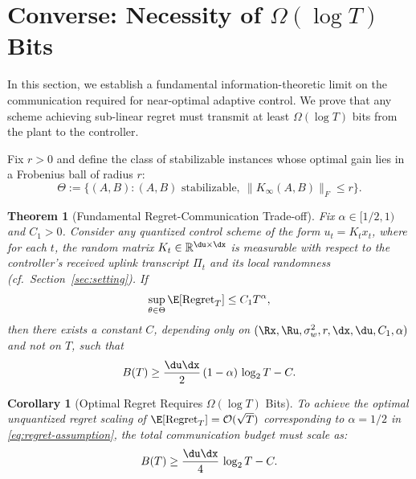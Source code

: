 \documentclass[11pt,journal,onecolumn]{IEEEtran}
\newtheorem{theorem}{Theorem}
\newtheorem{corollary}{Corollary}
\newcommand{\R}{\mathbb{R}}
\begin{document}
\section{Converse: Necessity of \texorpdfstring{$\Omega(\log T)$}{Omega(log T)} Bits}
\label{sec:converse}

In this section, we establish a fundamental information-theoretic limit on the communication required for near-optimal adaptive control. We prove that any scheme achieving sub-linear regret must transmit at least $\Omega(\log T)$ bits from the plant to the controller.

Fix $r>0$ and define the class of stabilizable instances whose optimal gain lies in a Frobenius ball of radius $r$:
\begin{equation}\label{eq:Theta-def}
    \Theta := \bigl\{(A,B) : (A,B) \text{ stabilizable},\ \|K_\infty(A,B)\|_F \le r\bigr\}.
\end{equation}

\begin{theorem}[Fundamental Regret-Communication Trade-off]\label{thm:main_converse}
    Fix $\alpha\in[1/2,1)$ and $C_1>0$. Consider any quantized control scheme of the form $u_t = K_t x_t$, where for each $t$, the random matrix $K_t\in\R^{\du\times\dx}$ is measurable with respect to the controller's received uplink transcript $\Pi_t$ and its local randomness (cf.\ Section~\ref{sec:setting}). If
    \begin{equation}\label{eq:regret-assumption}
        \sup_{\theta \in \Theta} \E[\mathrm{Regret}_T] \le C_1 T^\alpha,
    \end{equation}
    then there exists a constant $C$, depending only on $(\Rx,\Ru,\sigma_w^2,r,\dx,\du,C_1,\alpha)$ and not on $T$, such that
    \begin{equation}
        B(T)  \ge  \frac{\du\dx}{2}\,(1-\alpha)\,\log_2 T  -  C.
        \label{eq:bits-lb}
    \end{equation}
\end{theorem}

\begin{corollary}[Optimal Regret Requires $\Omega(\log T)$ Bits]\label{cor:sqrt-t}
    To achieve the optimal unquantized regret scaling of $\E[\mathrm{Regret}_T] = \mathcal{O}(\sqrt{T})$ corresponding to $\alpha = 1/2$ in \eqref{eq:regret-assumption}, the total communication budget must scale as:
    \begin{equation}
        B(T) \ge \frac{\du\dx}{4}\,\log_2 T - C.
        \label{eq:bits-lb-sqrt}
    \end{equation}
\end{corollary}
\end{document}
